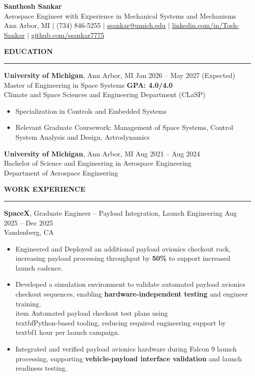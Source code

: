 \documentclass[10pt]{article}
\newcommand{\ressection}[1]{
  \vspace{0.12em}
  {\large\bfseries #1}\par
  \vspace{0.05em}\hrule\vspace{0.12em}
}
\begin{document}
\begin{center}
{\LARGE {\bfseries Santhosh Sankar}} \\
{\small Aerospace Engineer with Experience in Mechanical Systems and Mechanisms} \\
Ann Arbor, MI \enspace $\vert$ \enspace (734) 846-5255 \enspace $\vert$ \enspace
\href{mailto:ssankar@umich.edu}{ssankar@umich.edu} \enspace $\vert$ \enspace
\href{https://www.linkedin.com/in/santhosh-sankar-3241521b8/}{linkedin.com/in/Tosh-Sankar} \enspace $\vert$ \enspace
\href{https://github.com/ssankar7775}{github.com/ssankar7775}
\end{center}

\ressection{EDUCATION}

{\bfseries University of Michigan}, Ann Arbor, MI \hfill Jan 2026 -- May 2027 (Expected) \\
Master of Engineering in Space Systems \hfill {\bfseries GPA: 4.0/4.0} \\
Climate and Space Sciences and Engineering Department (CLaSP)

\begin{itemize}
  \item Specialization in Controls and Embedded Systems
  \item Relevant Graduate Coursework: Management of Space Systems, Control System Analysis and Design, Astrodynamics
\end{itemize}

{\bfseries University of Michigan}, Ann Arbor, MI \hfill Aug 2021 -- Aug 2024 \\
Bachelor of Science and Engineering in Aerospace Engineering \\
Department of Aerospace Engineering

\ressection{WORK EXPERIENCE}

{\bfseries SpaceX}, Graduate Engineer -- Payload Integration, Launch Engineering \hfill Aug 2025 -- Dec 2025 \\
Vandenberg, CA
\begin{itemize}
\item Engineered and Deployed an additional payload avionics checkout rack, increasing payload processing throughput by \textbf{50\%} to support increased launch cadence.
\item Developed a simulation environment to validate automated payload avionics checkout sequences, enabling \textbf{hardware-independent testing} and engineer training.
\\item Automated payload checkout test plans using \\textbf{Python-based tooling}, reducing required engineering support by \\textbf{1 hour per launch campaign}.
\item Integrated and verified payload avionics hardware during Falcon 9 launch processing, supporting \textbf{vehicle-payload interface validation} and launch readiness testing.
\end{itemize}
\end{document}
